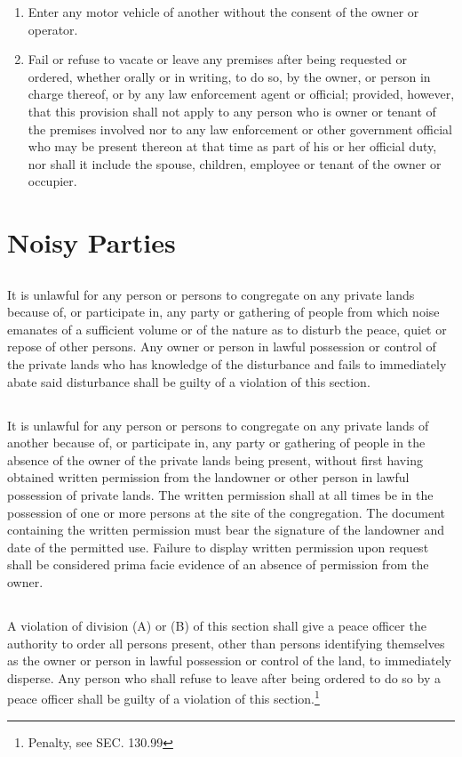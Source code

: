 \begin{enumerate}[{\indent}A)]
    \item Enter any motor vehicle of another without the consent of the owner or operator.
    \item Fail or refuse to vacate or leave any premises after being requested or ordered, whether orally or in writing, to do so, by the owner, or person in charge thereof, or by any law enforcement agent or official; provided, however, that this provision shall not apply to any person who is owner or tenant of the premises involved nor to any law enforcement or other government official who may be present thereon at that time as part of his or her official duty, nor shall it include the spouse, children, employee or tenant of the owner or occupier.
\end{enumerate}

\section{Noisy Parties}
\subsection{}
It is unlawful for any person or persons to congregate on any private lands because of, or participate in, any party or gathering of people from which noise emanates of a sufficient volume or of the nature as to disturb the peace, quiet or repose of other persons. Any owner or person in lawful possession or control of the private lands who has knowledge of the disturbance and fails to immediately abate said disturbance shall be guilty of a violation of this section.
\subsection{}
It is unlawful for any person or persons to congregate on any private lands of another because of, or participate in, any party or gathering of people in the absence of the owner of the private lands being present, without first having obtained written permission from the landowner or other person in lawful possession of private lands. The written permission shall at all times be in the possession of one or more persons at the site of the congregation. The document containing the written permission must bear the signature of the landowner and date of the permitted use. Failure to display written permission upon request shall be considered prima facie evidence of an absence of permission from the owner.
\subsection{}
A violation of division (A) or (B) of this section shall give a peace officer the authority to order all persons present, other than persons identifying themselves as the owner or person in lawful possession or control of the land, to immediately disperse. Any person who shall refuse to leave after being ordered to do so by a peace officer shall be guilty of a violation of this section.\footnote{Penalty, see SEC. 130.99}

